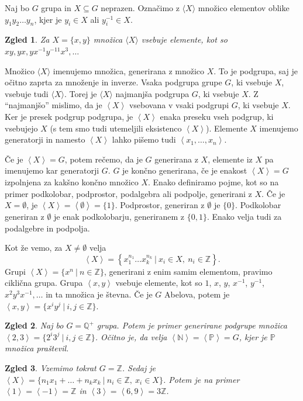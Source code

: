 \documentclass[10pt, a4paper]{article}
\newtheorem{zgled}{Zgled}[section]
\newcommand{\N}{\mathbb {N}}
\newcommand{\Z}{\mathbb {Z}}
\newcommand{\Q}{\mathbb {Q}}
\newcommand{\gen}[1]{\left\langle #1 \right\rangle}
\begin{document}
Naj bo $G$ grupa in $X \subseteq G$ neprazen. Označimo z $\langle X \rangle$ množico elementov oblike 
$y_1 y_2 \dots y_n$, kjer je $y_i \in X$ ali $y_i ^{-1} \in X$.

\begin{zgled}
  Za $X = \{x, y\}$ množica $\langle X \rangle$ vsebuje elemente, kot so $xy, yx, yx^{-1}y^{-11}x^3, \dots$
\end{zgled}

Množico $\langle X \rangle$ imenujemo množica, generirana z množico $X$.
To je podgrupa, saj je očitno zaprta za množenje in inverze.
Vsaka podgrupa grupe $G$, ki vsebuje $X$, vsebuje tudi $\langle X \rangle$. 
Torej je $\langle X \rangle$ najmanjša podgrupa $G$, ki vsebuje $X$.
Z "`najmanjšo"' mislimo, da je $\gen{X}$ vsebovana v vsaki podgrupi $G$, ki vsebuje $X$.
Ker je presek podgrup podgrupa, je $\gen{X}$ enaka preseku vseh podgrup, ki vsebujejo $X$
(s tem smo tudi utemeljili eksistenco $\gen{X}$).
Elemente $X$ imenujemo generatorji in namesto $\gen{X}$ lahko pišemo tudi $\gen{x_1, \dots, x_n}$.

Če je $\gen{X} = G$, potem rečemo, da je $G$ generirana z $X$,
elemente iz $X$ pa imenujemo kar generatorji $G$.
$G$ je končno generirana, če je enakost $\gen{X} = G$ izpolnjena za kakšno končno množico $X$.
Enako definiramo pojme, kot so na primer podkolobar, podprostor, podalgebra ali podpolje, generirani z $X$.
Če je $X = \emptyset$, je $\gen{X} = \gen{\emptyset} = \{1\}$.
Podprostor, generiran z $\emptyset$ je $\{0\}$.
Podkolobar generiran z $\emptyset$ je enak podkolobarju, generiranem z $\{0, 1\}$.
Enako velja tudi za podalgebre in podpolja.

Kot že vemo, za $X \neq \emptyset$ velja $$\gen{X} = \left\{x_1 ^{n_1} \dots x_k ^{n_k}\ |\ x_i \in X,\ n_i \in \Z \right\}.$$
Grupi $\gen{X} = \{x^n\ |\ n \in \Z\}$, generirani z enim samim elementom, pravimo ciklična grupa.
Grupa $\gen{x, y}$ vsebuje elemente, kot so $1$, $x$, $y$, $x^{-1}$, $y^{-1}$, $x^2 y^3x^{-1}, \dots$ in ta množica je števna. 
Če je $G$ Abelova, potem je $\gen{x, y} = \{x^i y^j\ |\ i,j \in \Z\}$.

\begin{zgled}
  Naj bo $G = \Q^+$ grupa.
  Potem je primer generirane podgrupe množica $\gen{2, 3} = \{2^i 3^j\ |\ i, j \in \Z\}$.
  Očitno je, da velja $\gen{\N} = \gen{\mathbb{P}} = G$, kjer je $\mathbb{P}$ množica praštevil.
\end{zgled}

\begin{zgled}
  Vzemimo tokrat $G = \Z$. 
  Sedaj je $\gen{X} = \{n_1 x_1 + \dots + n_k x_k\ |\ n_i \in \Z,\ x_i \in X\}$.
  Potem je na primer $\gen{1} = \gen{-1} = \Z$ in $\gen{3} = \gen{6, 9} = 3 \Z$.
\end{zgled}
\end{document}
